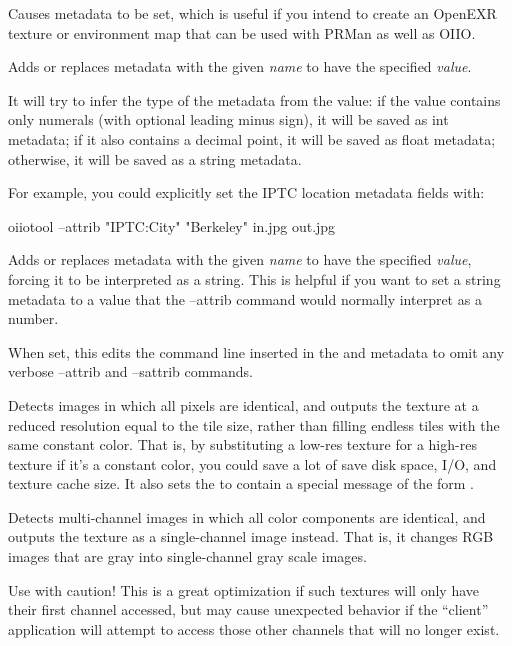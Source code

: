 Causes metadata  to be set, which is useful if
you intend to create an OpenEXR texture or environment map that can be
used with PRMan as well as OIIO.
\apiend

Adds or replaces metadata with the given \emph{name} to have the
specified \emph{value}.

It will try to infer the type of the metadata from the value: if the
value contains only numerals (with optional leading minus sign), it will
be saved as {\cf int} metadata; if it also contains a decimal point, it
will be saved as {\cf float} metadata; otherwise, it will be saved as
a {\cf string} metadata.

For example, you could explicitly set the IPTC location metadata fields
with:
\begin{code}
        oiiotool --attrib "IPTC:City" "Berkeley" in.jpg out.jpg
\end{code}
\apiend

Adds or replaces metadata with the given \emph{name} to have the
specified \emph{value}, forcing it to be interpreted as a {\cf string}.
This is helpful if you want to set a {\cf string} metadata to a value
that the {\cf --attrib} command would normally interpret as a number.
\apiend

When set, this edits the command line inserted in the  and
 metadata to omit any verbose {\cf --attrib} and
{\cf --sattrib} commands.
\apiend

Detects images in which all pixels are identical, and outputs the
texture at a reduced resolution equal to the tile size, rather than
filling endless tiles with the same constant color.  That is, by
substituting a low-res texture for a high-res texture if it's a constant
color, you could save a lot of save disk space, I/O, and texture cache size.
It also sets the  to contain a
special message of the form .  
\apiend

Detects multi-channel images in which all color components are
identical, and outputs the texture as a single-channel image instead.
That is, it changes RGB images that are gray into single-channel gray
scale images.

Use with caution!  This is a great optimization if such textures will
only have their first channel accessed, but may cause unexpected behavior
if the ``client'' application will attempt to access those other
channels that will no longer exist.
\apiend

